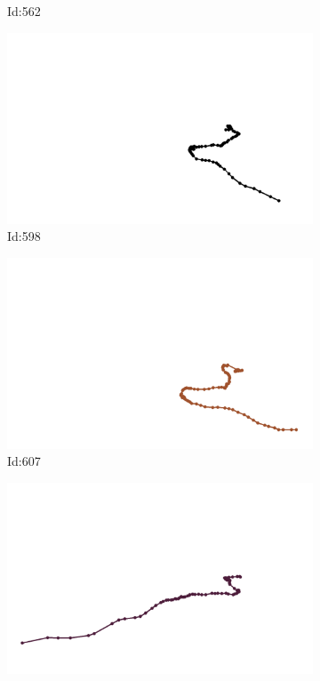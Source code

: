 \documentclass[12pt,twoside]{report}
\begin{document}
\begin{figure}
\begin{subfigure}[b]{0.20\textwidth}
\caption{Id:562}
\end{subfigure}
\begin{subfigure}[b]{0.20\textwidth}
\centering
\includegraphics[width=\textwidth]{../trajectories/598.png}
\caption{Id:598}
\end{subfigure}
\begin{subfigure}[b]{0.20\textwidth}
\centering
\includegraphics[width=\textwidth]{../trajectories/607.png}
\caption{Id:607}
\end{subfigure}
\begin{subfigure}[b]{0.20\textwidth}
\centering
\includegraphics[width=\textwidth]{../trajectories/655.png}

\end{subfigure}
\end{figure}
\end{document}
